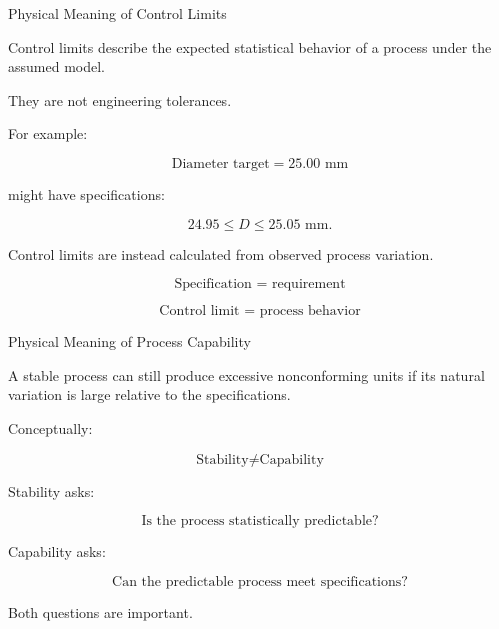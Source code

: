 \documentclass[aspectratio=169,10pt]{beamer}
\begin{document}

\begin{frame}[shrink=18]{Physical Meaning of Control Limits}
\small

Control limits describe the expected statistical behavior of a
process under the assumed model.

They are not engineering tolerances.

For example:

\[
\text{Diameter target}=25.00\text{ mm}
\]

might have specifications:

\[
24.95\le D\le25.05\text{ mm}.
\]

Control limits are instead calculated from observed process
variation.

\[
\boxed{
\text{Specification = requirement}
}
\]

\[
\boxed{
\text{Control limit = process behavior}
}
\]

\end{frame}


\begin{frame}[shrink=18]{Physical Meaning of Process Capability}
\small

A stable process can still produce excessive nonconforming units
if its natural variation is large relative to the specifications.

Conceptually:

\[
\boxed{
\text{Stability}
\neq
\text{Capability}
}
\]

Stability asks:

\[
\text{Is the process statistically predictable?}
\]

Capability asks:

\[
\text{Can the predictable process meet specifications?}
\]

Both questions are important.

\end{frame}

\end{document}
